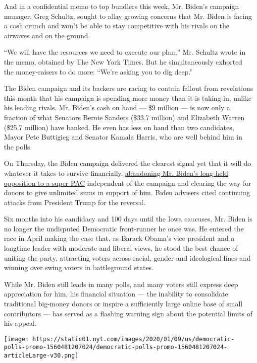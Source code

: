 And in a confidential memo to top bundlers this week, Mr. Biden's
campaign manager, Greg Schultz, sought to allay growing concerns that
Mr. Biden is facing a cash crunch and won't be able to stay competitive
with his rivals on the airwaves and on the ground.

``We will have the resources we need to execute our plan,'' Mr. Schultz
wrote in the memo, obtained by The New York Times. But he simultaneously
exhorted the money-raisers to do more: ``We're asking you to dig deep.''

The Biden campaign and its backers are racing to contain fallout from
revelations this month that his campaign is spending more money than it
is taking in, unlike his leading rivals. Mr. Biden's cash on hand ---
\$9 million --- is now only a fraction of what Senators Bernie Sanders
(\$33.7 million) and Elizabeth Warren (\$25.7 million) have banked. He
even has less on hand than two candidates, Mayor Pete Buttigieg and
Senator Kamala Harris, who are well behind him in the polls.

On Thursday, the Biden campaign delivered the clearest signal yet that
it will do whatever it takes to survive financially,
\href{https://www.nytimes.com/2019/10/24/us/politics/joe-biden-super-pac.html}{abandoning
Mr. Biden's long-held opposition to a super PAC} independent of the
campaign and clearing the way for donors to give unlimited sums in
support of him. Biden advisers cited continuing attacks from President
Trump for the reversal.

Six months into his candidacy and 100 days until the Iowa caucuses, Mr.
Biden is no longer the undisputed Democratic front-runner he once was.
He entered the race in April making the case that, as Barack Obama's
vice president and a longtime leader with moderate and liberal views, he
stood the best chance of uniting the party, attracting voters across
racial, gender and ideological lines and winning over swing voters in
battleground states.

While Mr. Biden still leads in many polls, and many voters still express
deep appreciation for him, his financial situation --- the inability to
consolidate traditional big-money donors or inspire a sufficiently large
online base of small contributors --- has served as a flashing warning
sign about the potential limits of his appeal.

\href{https://www.nytimes.com/interactive/2020/us/elections/democratic-polls.html}{}

\texttt{[image: https://static01.nyt.com/images/2020/01/09/us/democratic-polls-promo-1560481207024/democratic-polls-promo-1560481207024-articleLarge-v30.png]}

